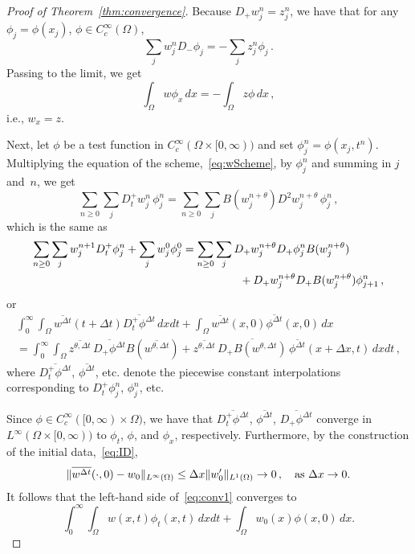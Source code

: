 \documentclass[11pt,leqno]{amsart}
\newcommand{\pt}[1]{#1_t}
\newcommand{\px}[1]{#1_x }
\newcommand{\Dtp}{D_t^+}
\newcommand{\Dp}{D_+}
\newcommand{\Dm}{D_-}
\newcommand{\DD}{D^2}
\newcommand{\normLinf}[1]{\norm{#1}_{L^\infty(\Omega)}}
\newcommand{\normLone}[1]{\norm{#1}_{L^1(\Omega)}}
\newcommand{\wcon}{\overline{w^{\Delta t}}}
\newcommand{\wthcon}{\overline{w^{\theta,\Delta t}}}
\newcommand{\zthcon}{\overline{z^{\theta,\Delta t}}}
\DeclarePairedDelimiter\norm{\lVert}{\rVert}
\begin{document}
\begin{proof}[Proof of Theorem~\ref{thm:convergence}]
Because $\Dp w^n_j=z^n_j$, we have that for any $\phi_j=\phi(x_j)$, $\phi \in C^\infty_c(\Omega)$,
\begin{equation*}
  \sum_j w^n_j \Dm \phi_j = - \sum_j z^n_j \phi_j\,.
\end{equation*} 
Passing to the limit, we get
\begin{equation*}
  \int_\Omega w \px{\phi} \,dx=- \int_\Omega z \phi \, dx\,,
\end{equation*}
i.e., $\px{w}=z$.

Next, let $\phi$ be a test function in $C^\infty_c(\Omega\times [0,\infty))$ and set $\phi^n_j=\phi(x_j,t^n)$. Multiplying the equation of the scheme,~\eqref{eq:wScheme}, by $\phi^n_j$ and summing in $j$ and~$n$, we get
\begin{equation*}
  \sum_{n\ge 0}\sum_j \Dtp w^n_j \, \phi^n_j = \sum_{n\ge 0}\sum_j B(w^{n+\theta}_j) \DD w^{n+\theta}_j\, \phi^n_j\,,
\end{equation*}
which is the same as
\begin{align*}
  \sum_{n\ge 0 }\sum_j w^{n+1}_j \Dtp \phi^n_j + \sum_j w^0_j \phi^0_j &= \sum_{n\ge 0}\sum_j \Dp w^{n+\theta}_j \Dp \phi^n_j B(w^{n+\theta}_j)\\&\hphantom{\sum_{n\ge 0}\sum_j}\qquad{}+ \Dp w^{n+\theta}_j \Dp B(w^{n+\theta}_j) \phi^n_{j+1}\,,
\end{align*}
or
\begin{multline}\label{eq:conv1}
  \int_0^\infty \int_\Omega \wcon(t+\Delta t) \overline{\Dtp \phi^{\Delta t}}\,dxdt + \int_\Omega \wcon(x,0)\overline{\phi^{\Delta t}}(x,0)\,dx \\ =\int_0^\infty \int_\Omega \zthcon\, \overline{\Dp \phi^{\Delta t}} B(\wthcon) + \zthcon\, \overline{\Dp B(w^{\theta,\Delta t})}\,\overline{\phi^{\Delta t}}(x+\Delta x,t)\,dxdt\,,
\end{multline}
where $\overline{\Dtp \phi^{\Delta t}}$, $\overline{\phi^{\Delta t}}$, etc. denote the piecewise constant interpolations corresponding to $\Dtp \phi^n_j$, $\phi^n_j$, etc.

Since $\phi\in C^\infty_c([0,\infty)\times \Omega)$, we have that $\overline{\Dtp \phi^{\Delta t}}$, $\overline{\phi^{\Delta t}}$, $\overline{\Dp \phi^{\Delta t}}$ converge in $L^\infty(\Omega\times[0,\infty))$ to $\pt{\phi}$, $\phi$, and $\px{\phi}$, respectively. Furthermore, by the construction of the initial data,~\eqref{eq:ID}, 
\begin{equation*}
  \normLinf{\wcon(\cdot,0)-w_0}\le \Delta x \normLone{w'_0}\rightarrow 0\,,\quad \text{as $\Delta x\rightarrow 0$.}
\end{equation*}
It follows that the left-hand side of~\eqref{eq:conv1} converges to
\begin{equation*}\label{eq:convLHS}
  \int_0^\infty \int_\Omega w (x,t)\pt{\phi}(x,t) \,dxdt + \int_\Omega w_0 (x)\phi(x,0)\,dx.
\end{equation*}


\end{proof}
\end{document}
